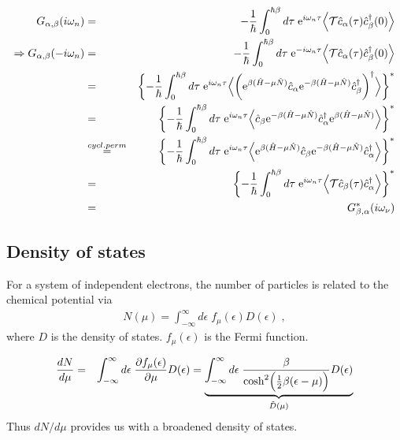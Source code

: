 \documentclass[11pt,a4paper]{report}
\begin{document}
\begin{eqnarray}
G_{\alpha,\beta}(i\omega_n)&=&
-\frac{1}{\hbar}\int_0^{\hbar\beta} d\tau\;\mathrm{e}^{i\omega_n\tau}
\Bigl\langle\mathcal{T}\hat{c}_\alpha(\tau)\hat{c}^\dagger_\beta(0)\Bigr\rangle
\\
\Rightarrow
G_{\alpha,\beta}(-i\omega_n)
&=&
-\frac{1}{\hbar}\int_0^{\hbar\beta} d\tau\;\mathrm{e}^{-i\omega_n\tau}
\Bigl\langle\mathcal{T}\hat{c}_\alpha(\tau)\hat{c}^\dagger_\beta(0)\Bigr\rangle
\nonumber\\
&=&
\biggl\lbrace
-\frac{1}{\hbar}\int_0^{\hbar\beta} d\tau\;\mathrm{e}^{i\omega_n\tau}
\Bigl\langle\biggl(\mathrm{e}^{\beta(\hat{H}-\mu\hat{N})}\hat{c}_\alpha
\mathrm{e}^{-\beta(\hat{H}-\mu\hat{N})}\hat{c}^\dagger_\beta\biggr)^\dagger
\Bigr\rangle
\biggr\rbrace^*
\nonumber\\
&=&
\biggl\lbrace
-\frac{1}{\hbar}\int_0^{\hbar\beta} d\tau\;\mathrm{e}^{i\omega_n\tau}
\Bigl\langle
\hat{c}_\beta\mathrm{e}^{-\beta(\hat{H}-\mu\hat{N})}\hat{c}^\dagger_\alpha
\mathrm{e}^{\beta(\hat{H}-\mu\hat{N})}
\Bigr\rangle
\biggr\rbrace^*
\nonumber\\
&\stackrel{cycl. perm}{=}&
\biggl\lbrace
-\frac{1}{\hbar}\int_0^{\hbar\beta} d\tau\;\mathrm{e}^{i\omega_n\tau}
\Bigl\langle
\mathrm{e}^{\beta(\hat{H}-\mu\hat{N})}
\hat{c}_\beta\mathrm{e}^{-\beta(\hat{H}-\mu\hat{N})}\hat{c}^\dagger_\alpha
\Bigr\rangle
\biggr\rbrace^*
\nonumber\\
&=&
\biggl\lbrace
-\frac{1}{\hbar}\int_0^{\hbar\beta} d\tau\;\mathrm{e}^{i\omega_n\tau}
\Bigl\langle
\mathcal{T}\hat{c}_\beta(\tau)\hat{c}^\dagger_\alpha
\Bigr\rangle
\biggr\rbrace^*
\nonumber\\
&=&
G_{\beta,\alpha}^*(i\omega_\nu)
\end{eqnarray}

\subsection{Density of states}
For a system of independent electrons, the number of particles is
related to the chemical potential via
\begin{eqnarray}
N(\mu)=\int_{-\infty}^\infty d\epsilon\; f_\mu(\epsilon) D(\epsilon)
\;,
\end{eqnarray}
where $D$ is the density of states. $f_\mu(\epsilon)$ is the Fermi function.

\begin{eqnarray}
\frac{dN}{d\mu}
&=&\int_{-\infty}^\infty d\epsilon\; 
\frac{\partial f_\mu(\epsilon)}{\partial\mu} D(\epsilon)
=
\underbrace{\int_{-\infty}^\infty d\epsilon\; 
\frac{\beta}{\cosh^2\Bigl(\frac{1}{2}\beta(\epsilon-\mu)\Bigr)} D(\epsilon)
}_{\tilde{D}(\mu)}
\end{eqnarray}
Thus $dN/d\mu$ provides us with a broadened density of states.
\end{document}

